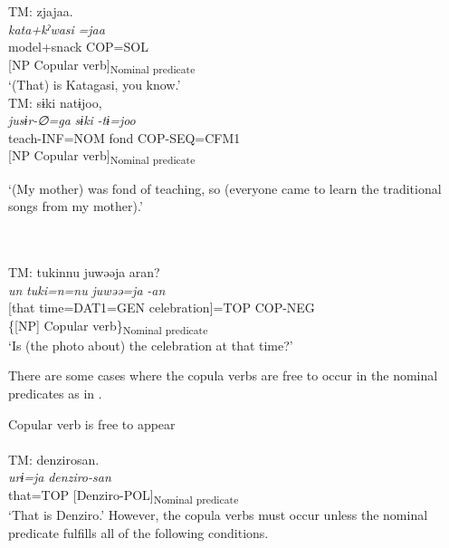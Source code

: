 \hfill\relax[Co: 111113\_01.txt]\\
   \\
   {TM:}   {zjajaa.}\\
     {\itshape kata+kˀwasi}  \textit{=jaa}\\
     {model+snack}  {COP=SOL}\\
     {[NP}  {Copular verb]\textsubscript{Nominal predicate}}\\
     \glt{} ‘(That) is Katagasi, you know.’
\hfill\relax[Co: 111113\_02.txt]\\
   TM:   {sɨki}  {natɨjoo,}\\
     {\itshape jusɨr-∅=ga}  {{\itshape sɨki}}  {{\textit{-tɨ=joo}}}\\
     {teach-INF=NOM}  {fond}  {COP-SEQ=CFM1}\\
     {}  {[NP}  {{Copular verb]\textsubscript{Nominal predicate}}}\\
     \glt{} \parbox{\linewidth - \widthof{TM: }}{‘(My mother) was fond of teaching, so (everyone came to learn the traditional songs from my mother).’}
     
\hfill\relax[Co: 120415\_00.txt]\\
   \\
   {TM:}   {{tukinnu}}  {juwəəja}  {aran?}\\
     {\itshape un}  {{\itshape tuki=n=nu}}  {\itshape juwəə=ja}  {\textit{-an}}\\
     {[that}  {{time=DAT1=GEN}}  {celebration]=TOP}  {COP-NEG}\\
     {\{[NP]}  {Copular verb\}\textsubscript{Nominal predicate}}\\
   \glt{} ‘Is (the photo about) the celebration at that time?’
   \z
\z

There are some cases where the copula verbs are free to occur in the nominal predicates as in .

\ea\label{ex:4.14} Copular verb is free to appear\hfill\relax[Co: 120415\_00.txt]\\
\\
 {TM:}   {denzirosan.}\\
   {\itshape urɨ=ja}  {\itshape denziro-san}\\
   {that=TOP}  {[Denziro-POL]\textsubscript{Nominal predicate}}\\
\glt{} ‘That is Denziro.’
\z
\noindent However, the copula verbs must occur unless the nominal predicate fulfills all of the following conditions.

